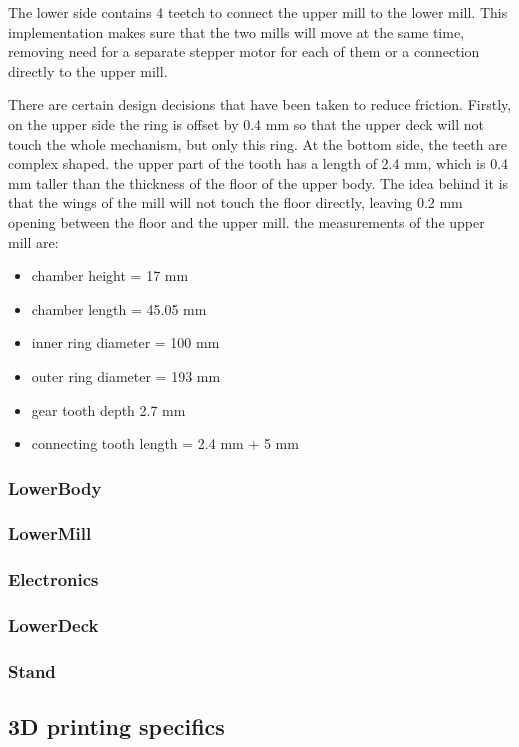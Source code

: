 The lower side contains 4 teetch to connect the upper mill to the lower mill. This implementation makes sure that the two mills will move at the same time, removing need for a separate stepper motor for each of them or a connection directly to the upper mill.

There are certain design decisions that have been taken to reduce friction. Firstly, on the upper side the ring is offset by 0.4 mm so that the upper deck will not touch the whole mechanism, but only this ring. At the bottom side, the teeth are complex shaped. the upper part of the tooth has a length of 2.4 mm, which is 0.4 mm taller than the thickness of the floor of the upper body. The idea behind it is that the wings of the mill will not touch the floor directly, leaving 0.2 mm opening between the floor and the upper mill. 
the measurements of the upper mill are:
\begin{itemize}
	\item chamber height = 17 mm
	\item[] chamber length = 45.05 mm
	\item inner ring diameter = 100 mm
	\item outer ring diameter = 193 mm
	\item gear tooth depth 2.7 mm
	\item connecting tooth length = 2.4 mm + 5 mm
\end{itemize}
\subsubsection{LowerBody}
\subsubsection{LowerMill}
\subsubsection{Electronics}
\subsubsection{LowerDeck}
\subsubsection{Stand}
\subsection{3D printing specifics}
